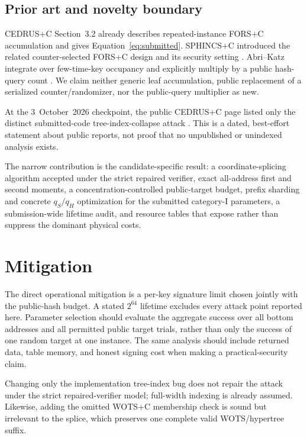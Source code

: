 \documentclass[11pt,a4paper]{article}
\begin{document}
\subsection{Prior art and novelty boundary}

CEDRUS+C Section~3.2 already describes repeated-instance FORS+C accumulation
and gives Equation~\eqref{eq:submitted}.  SPHINCS+C introduced the related
counter-selected FORS+C design and its security setting \cite{sphincsc}.
Abri--Katz integrate over few-time-key occupancy and explicitly multiply by a
public hash-query count \cite{abri-katz}.  We claim neither generic leaf
accumulation, public replacement of a serialized counter/randomizer, nor the
public-query multiplier as new.

At the 3~October~2026 checkpoint, the public CEDRUS+C page listed only the
distinct submitted-code tree-index-collapse attack \cite{ngcc-cedrus}.  This
is a dated, best-effort statement about public reports, not proof that no
unpublished or unindexed analysis exists.

The narrow contribution is the candidate-specific result: a coordinate-splicing
algorithm accepted under the strict repaired verifier, exact all-address
first and second moments, a concentration-controlled public-target budget,
prefix sharding and concrete $q_S/q_H$ optimization for the submitted
category-I parameters, a submission-wide lifetime audit, and resource tables
that expose rather than suppress the dominant physical costs.

\section{Mitigation}

The direct operational mitigation is a per-key signature limit chosen jointly
with the public-hash budget.  A stated $2^{64}$ lifetime excludes every attack
point reported here.  Parameter selection should evaluate the aggregate
success over all bottom addresses and all permitted public target trials,
rather than only the success of one random target at one instance.  The same
analysis should include returned data, table memory, and honest signing cost
when making a practical-security claim.

Changing only the implementation tree-index bug does not repair the attack
under the strict repaired-verifier model; full-width indexing is already
assumed.  Likewise,
adding the omitted WOTS+C membership check is sound but irrelevant to the
splice, which preserves one complete valid WOTS/hypertree suffix.
\end{document}
